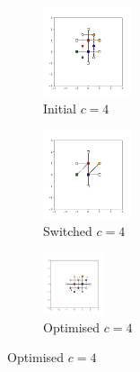 \begin{figure}[bt]
     \vspace{2mm}
     \begin{subfigure}[b]{0.25\textwidth}
         \centering
         \includegraphics[height=2.6cm]{./figures/general_networks/bs_move_d.pdf}
         \caption{Initial $c=4$}
         \label{fig:bsmoved}
     \end{subfigure}
     \hfill
     \begin{subfigure}[b]{0.25\textwidth}
         \centering
         \includegraphics[height=2.6cm]{./figures/general_networks/bs_move_e.pdf}
         \caption{Switched $c=4$}
         \label{fig:bsmovee}
     \end{subfigure}
     \hfill
     \begin{subfigure}[b]{0.25\textwidth}
         \centering
         \includegraphics[height=1.8cm]{./figures/general_networks/bs_move_f.pdf}
         \caption{Optimised $c=4$}
         \label{fig:bsmovef}
     \end{subfigure}
     

\end{figure}
